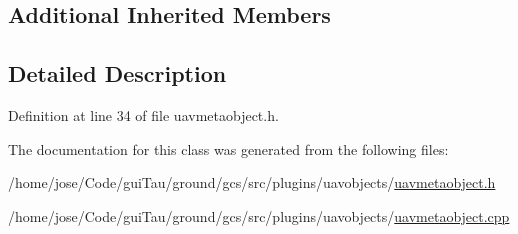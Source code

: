 \subsection*{Additional Inherited Members}


\subsection{Detailed Description}


Definition at line 34 of file uavmetaobject.\-h.



The documentation for this class was generated from the following files\-:\begin{DoxyCompactItemize}
\item 
/home/jose/\-Code/gui\-Tau/ground/gcs/src/plugins/uavobjects/\hyperlink{uavmetaobject_8h}{uavmetaobject.\-h}\item 
/home/jose/\-Code/gui\-Tau/ground/gcs/src/plugins/uavobjects/\hyperlink{uavmetaobject_8cpp}{uavmetaobject.\-cpp}\end{DoxyCompactItemize}
